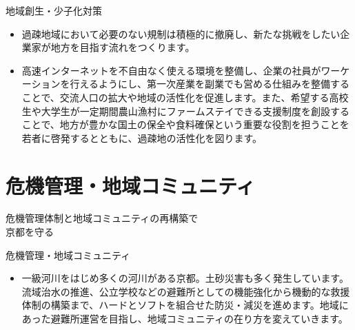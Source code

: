 \documentclass[dvipdfmx]{beamer}
\begin{document}
    \begin{frame}{地域創生・少子化対策}{}
        \begin{small}
            \begin{itemize}
                \setlength{\itemsep}{2mm}
                \item 過疎地域において必要のない規制は積極的に撤廃し、新たな挑戦をしたい企業家が地方を目指す流れをつくります。
                \item 高速インターネットを不自由なく使える環境を整備し、企業の社員がワーケーションを行えるようにし、第一次産業を副業でも営める仕組みを整備することで、交流人口の拡大や地域の活性化を促進します。また、希望する高校生や大学生が一定期間農山漁村にファームステイできる支援制度を創設することで、地方が豊かな国土の保全や食料確保という重要な役割を担うことを若者に啓発するとともに、過疎地の活性化を図ります。
            \end{itemize}
        \end{small}
    \end{frame}

\section{危機管理・地域コミュニティ}
    \begin{frame}{}{}
        \sectionpage
        \begin{center}
            \begin{large}
                \alert{危機管理体制と地域コミュニティの再構築で}\\\alert{京都を守る}
            \end{large}
        \end{center}
    \end{frame}
    
    \begin{frame}{危機管理・地域コミュニティ}{}
        \begin{small}
            \begin{itemize}
                \setlength{\itemsep}{2mm}
                \item 一級河川をはじめ多くの河川がある京都。土砂災害も多く発生しています。流域治水の推進、公立学校などの避難所としての機能強化から機動的な救援体制の構築まで、ハードとソフトを組合せた防災・減災を進めます。地域にあった避難所運営を目指し、地域コミュニティの在り方を変えていきます。
            \end{itemize}
        \end{small}
    \end{frame}
    
\end{document}
